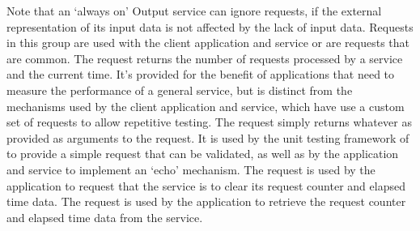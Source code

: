 Note that an `always on' Output service can ignore
 requests, if the external
representation of its input data is not affected by the lack of input data.
\secondaryEnd{}
Requests in this group are used with the  client
application and  service or are requests that are
common.
The  request returns the number of
requests processed by a service and the current time.
It's provided for the benefit of applications that need to measure the performance of a
general service, but is distinct from the mechanisms used by the
 client application and
 service, which have use a custom set of requests
to allow repetitive testing.
The  request simply returns whatever
as provided as arguments to the request.
It is used by the unit testing framework of \mplusm{} to provide a simple request that
can be validated, as well as by the  application
and  service to implement an `echo' mechanism.
The  request is used by the
 application to request that the
 service is to clear its request counter and
elapsed time data.
The  request is used by the
 application to retrieve the request counter and
elapsed time data from the  service.
\secondaryEnd{}
\primaryEnd{}
